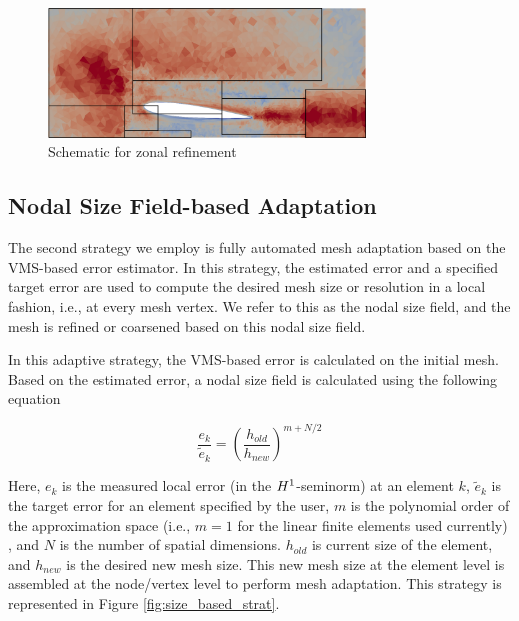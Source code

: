 \begin{figure}[H]
	\centering
	\includegraphics[width=0.75\textwidth]{figures/adapt_strat/zonal_based_schematic.png}
	\caption{Schematic for zonal refinement}
	\label{fig:zonal_based_strat_schematic}
\end{figure}

\subsection{Nodal Size Field-based Adaptation}

The second strategy we employ is fully automated mesh adaptation based on the VMS-based error estimator. In this strategy, the estimated error and a specified target error are used to compute the desired mesh size or resolution in a local fashion, i.e., at every mesh vertex. We refer to this as the nodal size field, and the mesh is refined or coarsened based on this nodal size field. 

In this adaptive strategy, the VMS-based error is calculated on the initial mesh. Based on the estimated error, a nodal size field is calculated using the following equation \cite{zhang19}

\begin{equation}
	\frac{e_k}{\tilde{e}_k} = \left(\frac{h_{old}}{h_{new}}\right)^{m+N/2} 
	\label{eq:diez}
\end{equation}

Here, $e_k$ is the measured local error (in the $H^{1}$-seminorm) at an element $k$, $\tilde{e}_k$ is the target error for an element specified by the user, $m$ is the polynomial order of the approximation space (i.e., $m=1$ for the linear finite elements used currently) , and $N$ is the number of spatial dimensions. $h_{old}$ is current size of the element, and $h_{new}$ is the desired new mesh size.
This new mesh size at the element level is assembled at the node/vertex level to perform mesh adaptation.
This strategy is represented in Figure \ref{fig:size_based_strat}.

